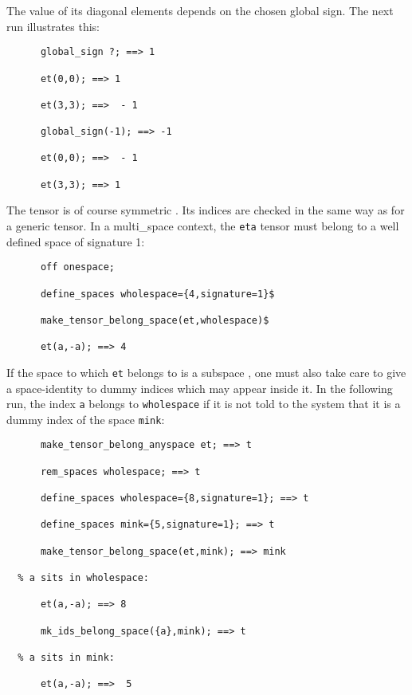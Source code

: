 The value of its diagonal elements depends on the chosen
global sign. The next run illustrates this:
\begin{verbatim}
      global_sign ?; ==> 1

      et(0,0); ==> 1

      et(3,3); ==>  - 1

      global_sign(-1); ==> -1

      et(0,0); ==>  - 1

      et(3,3); ==> 1
\end{verbatim}
The tensor is of course symmetric .  
Its indices are checked in the same way as for a generic tensor.
In a multi\_space context, the \texttt{eta} tensor must belong 
to a well defined space of 
signature 1:
\begin{verbatim}
      off onespace;

      define_spaces wholespace={4,signature=1}$  

      make_tensor_belong_space(et,wholespace)$

      et(a,-a); ==> 4
\end{verbatim}
If the space to which \texttt{et} belongs to is a subspace%
,
one must also
take care to give a space-identity to dummy indices which may appear inside 
it. In the following run, the index \texttt{a} belongs to \texttt{wholespace} 
if it is not told to the system that it is a dummy 
index of the space \texttt{mink}:
\begin{verbatim}
      make_tensor_belong_anyspace et; ==> t

      rem_spaces wholespace; ==> t

      define_spaces wholespace={8,signature=1}; ==> t

      define_spaces mink={5,signature=1}; ==> t

      make_tensor_belong_space(et,mink); ==> mink

  % a sits in wholespace:
   
      et(a,-a); ==> 8

      mk_ids_belong_space({a},mink); ==> t

  % a sits in mink:

      et(a,-a); ==>  5    
\end{verbatim}

